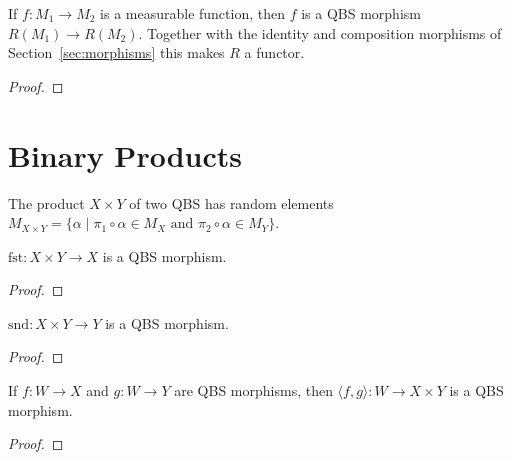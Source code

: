 \begin{lemma}\label{lem:R_qbs_morph}
  \rocqok
  If $f : M_1 \to M_2$ is a measurable function, then $f$ is a QBS morphism
  $R(M_1) \to R(M_2)$. Together with the identity and composition
  morphisms of Section~\ref{sec:morphisms} this makes $R$ a functor.
\end{lemma}
\begin{proof}\rocqok\end{proof}

\section{Binary Products}\label{sec:products}

\begin{definition}\label{def:prodQ}
  \rocqok
  The product $X \times Y$ of two QBS has random elements
  $M_{X \times Y} = \{\alpha \mid \pi_1 \circ \alpha \in M_X
  \text{ and } \pi_2 \circ \alpha \in M_Y\}$.
\end{definition}

\begin{lemma}\label{lem:qbs_morphism_fst}
  \rocqok
  $\mathrm{fst} : X \times Y \to X$ is a QBS morphism.
\end{lemma}
\begin{proof}\rocqok\end{proof}

\begin{lemma}\label{lem:qbs_morphism_snd}
  \rocqok
  $\mathrm{snd} : X \times Y \to Y$ is a QBS morphism.
\end{lemma}
\begin{proof}\rocqok\end{proof}

\begin{lemma}\label{lem:qbs_morphism_pair}
  \rocqok
  If $f : W \to X$ and $g : W \to Y$ are QBS morphisms, then
  $\langle f, g \rangle : W \to X \times Y$ is a QBS morphism.
\end{lemma}
\begin{proof}\rocqok\end{proof}

